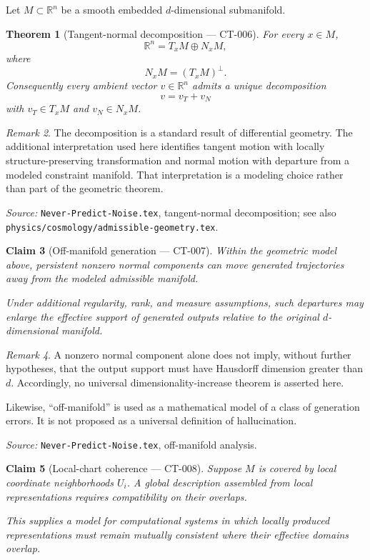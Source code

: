 \documentclass[11pt]{article}
\newtheorem{theorem}{Theorem}[section]
\newtheorem{claim}[theorem]{Claim}
\theoremstyle{definition}
\theoremstyle{remark}
\newtheorem{remark}[theorem]{Remark}
\begin{document}
Let $M\subset\mathbb{R}^n$ be a smooth embedded $d$-dimensional submanifold.

\begin{theorem}[Tangent-normal decomposition --- CT-006]
For every $x\in M$,
\[
  \mathbb{R}^n
  =
  T_xM\oplus N_xM,
\]
where
\[
  N_xM=(T_xM)^\perp.
\]
Consequently every ambient vector $v\in\mathbb{R}^n$ admits a unique
decomposition
\[
  v=v_T+v_N
\]
with $v_T\in T_xM$ and $v_N\in N_xM$.
\end{theorem}

\begin{remark}
The decomposition is a standard result of differential geometry. The
additional interpretation used here identifies tangent motion with locally
structure-preserving transformation and normal motion with departure from a
modeled constraint manifold. That interpretation is a modeling choice rather
than part of the geometric theorem.
\end{remark}

\noindent\emph{Source:} \texttt{Never-Predict-Noise.tex}, tangent-normal
decomposition; see also
\texttt{physics/cosmology/admissible-geometry.tex}.

\begin{claim}[Off-manifold generation --- CT-007]
Within the geometric model above, persistent nonzero normal components can
move generated trajectories away from the modeled admissible manifold.

Under additional regularity, rank, and measure assumptions, such departures
may enlarge the effective support of generated outputs relative to the
original $d$-dimensional manifold.
\end{claim}

\begin{remark}
A nonzero normal component alone does not imply, without further hypotheses,
that the output support must have Hausdorff dimension greater than $d$.
Accordingly, no universal dimensionality-increase theorem is asserted here.

Likewise, ``off-manifold'' is used as a mathematical model of a class of
generation errors. It is not proposed as a universal definition of
hallucination.
\end{remark}

\noindent\emph{Source:} \texttt{Never-Predict-Noise.tex}, off-manifold
analysis.

\begin{claim}[Local-chart coherence --- CT-008]
Suppose $M$ is covered by local coordinate neighborhoods $U_i$. A global
description assembled from local representations requires compatibility on
their overlaps.

This supplies a model for computational systems in which locally produced
representations must remain mutually consistent where their effective domains
overlap.
\end{claim}
\end{document}
